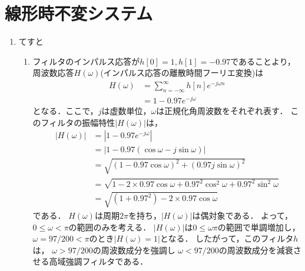 \section{線形時不変システム}

\begin{enumerate}[label=問\arabic*.]
  \vspace{2mm}
  \item てすと
  \vspace{1mm}
  \begin{enumerate}[label=(\arabic*)]
    \item フィルタのインパルス応答が$h[0] = 1, h[1] = -0.97$であることより，
      周波数応答$H(\omega)$(インパルス応答の離散時間フーリエ変換)は
      \begin{align}
        H(\omega) &= \sum_{n = -\infty}^{\infty} h[n] e^{-j\omega n} \\
                  &= 1 - 0.97 e^{-j \omega}
      \end{align}
      となる．ここで，$j$は虚数単位，$\omega$は正規化角周波数をそれぞれ表す．
      このフィルタの振幅特性$|H(\omega)|$は，
      \begin{align}
        |H(\omega)| &= | 1 - 0.97 e^{-j \omega}| \\
                    &= | 1 - 0.97 (\cos \omega - j \sin \omega)| \\
                    &= \sqrt{(1 - 0.97 \cos \omega)^2 + (0.97 j \sin \omega)^2} \\
                    &= \sqrt{1 - 2 \times 0.97 \cos \omega + 0.97^2 \cos^2 \omega
                     + 0.97^2 \sin^2 \omega} \\
                    &= \sqrt{(1 + 0.97^2) - 2 \times 0.97 \cos \omega}
      \end{align}
      である．
      $H(\omega)$は周期$2\pi$を持ち，$|H(\omega)|$は偶対象である．
      よって，$0 \le \omega < \pi$の範囲のみを考える．
      $|H(\omega)|$は$0 \le \omega \pi$の範囲で単調増加し，
      $\omega = 97 / 200 < \pi$のとき$|H(\omega) = 1|$となる．
      したがって，このフィルタ$h$は，
      $\omega > 97 / 200$の周波数成分を強調し
      $\omega < 97 / 200$の周波数成分を減衰させる高域強調フィルタである．
  \end{enumerate}
  
\end{enumerate}